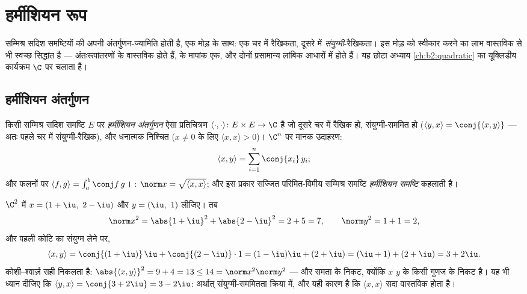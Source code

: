 \chapter{हर्मीशियन रूप}\label{ch:b2:hermitian}

सम्मिश्र सदिश समष्टियों की अपनी अंतर्गुणन-ज्यामिति होती है, एक मोड़ के
साथ: एक चर में रैखिकता, दूसरे में \emph{संयुग्मी}-रैखिकता। इस मोड़ को
स्वीकार करने का लाभ वास्तविक से भी स्वच्छ  सिद्धांत है ---
 अंतःरूपांतरणों के  वास्तविक होते हैं,  के
मापांक एक, और दोनों प्रसामान्य लांबिक आधारों में  होते हैं। यह
छोटा अध्याय \cref{ch:b2:quadratic} का यूक्लिडीय कार्यक्रम $\C$ पर चलाता है।

\section{हर्मीशियन अंतर्गुणन}

\begin{definition}\label{def:b2:hermitian:def}
किसी सम्मिश्र सदिश समष्टि $E$ पर \emph{हर्मीशियन
अंतर्गुणन} ऐसा प्रतिचित्रण $\langle\cdot,\cdot\rangle
\colon E \times E \to \C$ है जो दूसरे चर
में रैखिक हो, संयुग्मी-सममित हो ($\langle y, x\rangle = \conj{\langle x,
y\rangle}$ --- अतः पहले चर में संयुग्मी-रैखिक),
और धनात्मक निश्चित ($x \neq 0$ के लिए $\langle x, x\rangle > 0$)। $\C^n$ पर मानक उदाहरण:
\[
\langle x, y \rangle = \sum_{i=1}^{n} \conj{x_i}\, y_i ;
\]
और  फलनों पर $\langle f, g\rangle = \int_a^b \conj
f\,g$। : $\norm x = \sqrt{\langle x,x\rangle}$; और इस प्रकार सज्जित परिमित-विमीय
सम्मिश्र समष्टि \emph{हर्मीशियन समष्टि} कहलाती है।
\end{definition}

\begin{example}\label{ex:b2:hermitian:firstcomp}
$\C^2$ में $x = (1+\iu,\ 2-\iu)$ और $y = (\iu,\ 1)$ लीजिए। तब
\[
\norm x^2 = \abs{1+\iu}^2 + \abs{2-\iu}^2 = 2 + 5 = 7,
\qquad
\norm y^2 = 1 + 1 = 2,
\]
और पहली कोटि का संयुग्म लेने पर,
\[
\langle x, y\rangle
= \conj{(1+\iu)}\,\iu + \conj{(2-\iu)}\cdot1
= (1-\iu)\iu + (2+\iu)
= (\iu + 1) + (2 + \iu) = 3 + 2\iu .
\]
कोशी--श्वार्ज़ सही निकलता है: $\abs{\langle x, y\rangle}^2 = 9 +
4 = 13 \leq 14 = \norm x^2\norm y^2$ --- और समता के निकट, क्योंकि $x$ $y$ के
किसी गुणज के निकट है। यह भी ध्यान दीजिए कि $\langle y, x\rangle = \conj{3 + 2\iu} = 3 - 2\iu$: अर्थात् संयुग्मी-सममितता
क्रिया में, और यही कारण है कि $\langle x,
x\rangle$ सदा वास्तविक होता है।
\end{example}

